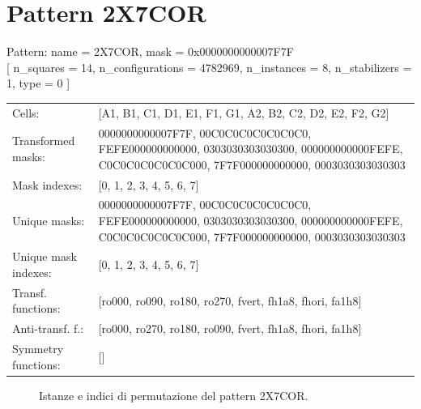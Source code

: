 \newpage

\section{Pattern 2X7COR}

\begin{tcolorbox}[sharp corners, fontupper=\ttfamily\small, colback=white]
  \noindent Pattern: name = 2X7COR, mask = 0x0000000000007F7F\\
  {[} n\_squares = 14, n\_configurations = 4782969,
  n\_instances = 8, n\_stabilizers = 1, type = 0 { ]}\\[1.0ex]
  \begin{tabularx}{\textwidth}{@{} p{3.5cm} X @{}}
    Cells:               & {[}A1, B1, C1, D1, E1, F1, G1, A2, B2, C2, D2, E2, F2, G2{]}\\[0.5ex]
    Transformed masks:   & 0000000000007F7F, 00C0C0C0C0C0C0C0, FEFE000000000000, 0303030303030300, 000000000000FEFE, C0C0C0C0C0C0C000, 7F7F000000000000, 0003030303030303\\[0.5ex]
    Mask indexes:        & {[}0, 1, 2, 3, 4, 5, 6, 7{]}\\[0.5ex]
    Unique masks:        & 0000000000007F7F, 00C0C0C0C0C0C0C0, FEFE000000000000, 0303030303030300, 000000000000FEFE, C0C0C0C0C0C0C000, 7F7F000000000000, 0003030303030303\\[0.5ex]
    Unique mask indexes: & {[}0, 1, 2, 3, 4, 5, 6, 7{]}\\[0.5ex]
    Transf. functions:   & {[}ro000, ro090, ro180, ro270, fvert, fh1a8, fhori, fa1h8{]}\\[0.5ex]
    Anti-transf. f.:     & {[}ro000, ro270, ro180, ro090, fvert, fh1a8, fhori, fa1h8{]}\\[0.5ex]
    Symmetry functions:  & {[}{]}\\[0.5ex]
  \end{tabularx}
\end{tcolorbox}

\begin{figure}[htbp]
  \centering
   \hfill
   \hfill
   \hfill
  \vspace{0.3cm}
   \hfill
   \hfill
   \hfill
  \caption{Istanze e indici di permutazione del pattern 2X7COR.}
\end{figure}

